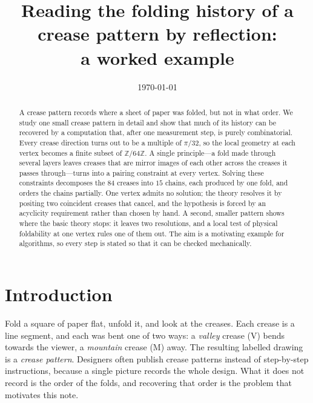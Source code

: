 \documentclass[11pt]{article}
\title{Reading the folding history of a crease pattern by reflection:\\ a worked example}
\author{}
\date{\today}
\theoremstyle{definition}
\theoremstyle{remark}
\newcommand{\Z}{\mathbb{Z}}
\newcommand{\ZN}{\Z/64\Z}
\begin{document}
\maketitle

\begin{abstract}
A crease pattern records where a sheet of paper was folded, but not in what order. We study one small crease pattern in detail and show that much of its history can be recovered by a computation that, after one measurement step, is purely combinatorial. Every crease direction turns out to be a multiple of $\pi/32$, so the local geometry at each vertex becomes a finite subset of $\ZN$. A single principle---a fold made through several layers leaves creases that are mirror images of each other across the creases it passes through---turns into a pairing constraint at every vertex. Solving these constraints decomposes the $84$ creases into $15$ chains, each produced by one fold, and orders the chains partially. One vertex admits no solution; the theory resolves it by positing two coincident creases that cancel, and the hypothesis is forced by an acyclicity requirement rather than chosen by hand. A second, smaller pattern shows where the basic theory stops: it leaves two resolutions, and a local test of physical foldability at one vertex rules one of them out. The aim is a motivating example for algorithms, so every step is stated so that it can be checked mechanically.
\end{abstract}

\section{Introduction}

Fold a square of paper flat, unfold it, and look at the creases. Each crease is a line segment, and each was bent one of two ways: a \emph{valley} crease (V) bends towards the viewer, a \emph{mountain} crease (M) away. The resulting labelled drawing is a \emph{crease pattern}. Designers often publish crease patterns instead of step-by-step instructions, because a single picture records the whole design. What it does not record is the order of the folds, and recovering that order is the problem that motivates this note.
\end{document}
